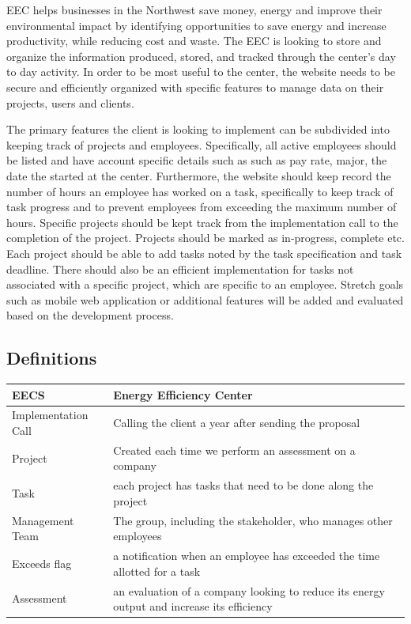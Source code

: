 \documentclass[letterpaper,10pt,titlepage,journal,compsoc,draftclsnofoot,onecolumn]{IEEEtran}
\begin{document}
EEC helps businesses in the Northwest save money, energy and improve their environmental impact by identifying opportunities to save energy and increase productivity, while reducing cost and waste. The EEC is looking to store and organize the information produced, stored, and tracked through the center’s day to day activity. In order to be most useful to the center, the website needs to be secure and efficiently organized with specific features to manage data on their projects, users and clients.\par
The primary features the client is looking to implement can be subdivided into keeping track of projects and employees. Specifically, all active employees should be listed and have account specific details such as such as pay rate, major, the date the started at the center. Furthermore, the website should keep record the number of hours an employee has worked on a task, specifically to keep track of task progress and to prevent employees from exceeding the maximum number of hours. Specific projects should be kept track from the implementation call to the completion of the project. Projects should be marked as in-progress, complete etc. Each project should be able to add tasks noted by the task specification and task deadline. There should also be an efficient implementation for tasks not associated with a specific project, which are specific to an employee. Stretch goals such as mobile web application or additional features will be added and evaluated based on the development process. 

\subsection{Definitions}

\begin{tabular}{ | l | l | }
\hline
	EECS & Energy Efficiency Center \\ \hline
	Implementation Call & Calling the client a year after sending the proposal \\ \hline
	Project & Created each time we perform an assessment on a company \\ \hline
	Task & each project has tasks that need to be done along the project \\ \hline
	Management Team & The group, including the stakeholder, who manages other employees \\ \hline
	Exceeds flag & a notification when an employee has exceeded the time allotted for a task \\ \hline
	Assessment & an evaluation of a company looking to reduce its energy output and increase its efficiency \\ \hline
\end{tabular}
\end{document}
